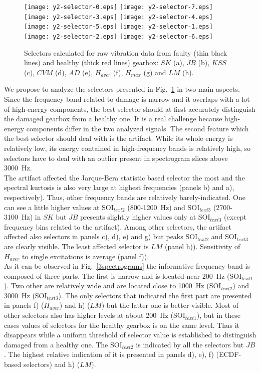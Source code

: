 \documentclass[3p,times]{elsarticle}
\begin{document}
\begin{figure}[!ht]
\begin{center}
\texttt{[image: y2-selector-0.eps]}
\texttt{[image: y2-selector-7.eps]}
\texttt{[image: y2-selector-3.eps]}
\texttt{[image: y2-selector-4.eps]}
\texttt{[image: y2-selector-5.eps]}
\texttt{[image: y2-selector-1.eps]}
\texttt{[image: y2-selector-2.eps]}
\texttt{[image: y2-selector-6.eps]}
\caption{Selectors calculated for raw vibration data from faulty (thin black lines) and healthy (thick red lines) gearbox: $SK$ (a), $JB$ (b), $KSS$ (c), $CVM$ (d), $AD$ (e), $H_{aver}$ (f), $H_{max}$ (g) and $LM$ (h).}
\label{3selectors}
\end{center}
\end{figure}
We propose to analyze the selectors presented in Fig.~\ref{3selectors} in two main aspects. Since the frequency band related to damage is narrow and it overlaps with a lot of high-energy components, the best selector should at first accurately distinguish the damaged gearbox from a healthy one. It is a real challenge because high-energy components differ in the two analyzed signals. The second feature which the best selector should deal with is the artifact. While its whole energy is relatively low, its energy contained in high-frequency bands is relatively high, so selectors have to deal with an outlier present in spectrogram slices above 3000~Hz.\\
The artifact affected the Jarque-Bera statistic based selector the most and the spectral kurtosis is also very large at highest frequencies (panels b) and a), respectively). Thus, other frequency bands are relatively barely-indicated. One can see a little higher values at SOI$_{text{2}}$ (800-1200~Hz) and SOI$_{text{3}}$ (2700-3100~Hz) in $SK$ but $JB$ presents slightly higher values only at SOI$_{text{3}}$ (except frequency bins related to the artifact). Among other selectors, the artifact affected also selectors in panels c), d), e) and g) but peaks SOI$_{text{2}}$ and SOI$_{text{3}}$ are clearly visible. The least affected selector is $LM$ (panel h)). Sensitivity of $H_{aver}$ to single excitations is average (panel f)).\\
As it can be observed in Fig.~\ref{3spectrograms} the informative frequency band is composed of three parts. The first is narrow and is located near 200~Hz (SOI$_{text{1}}$). Two other are relatively wide and are located close to 1000~Hz (SOI$_{text{2}}$) and 3000~Hz (SOI$_{text{3}}$). The only selectors that indicated the first part are presented in panels f) ($H_{aver}$) and h) ($LM$) but the latter one is better visible. Most of other selectors also has higher levels at about 200~Hz (SOI$_{text{1}}$), but in these cases values of selectors for the healthy gearbox is on the same level. Thus it disappears while a uniform threshold of selector value is established to distinguish damaged from a healthy one. The SOI$_{text{2}}$ is indicated by all the selectors but $JB$. The highest relative indication of it is presented in panels d), e), f) (ECDF-based selectors) and h) ($LM$).\\
\end{document}
